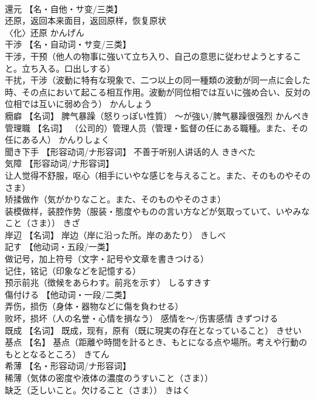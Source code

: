 \documentclass[8pt]{extreport}
\begin{document}
\begin{CJK}{UTF8}{min}
\\	還元	【名・自他・サ变/三类】 
\\	还原，返回本来面目，返回原样，恢复原状 
\\	〈化〉还原	かんげん	
\\	干渉	【名・自动词・サ变/三类】 
\\	干涉，干预（他人の物事に強いて立ち入り、自己の意思に従わせようとすること。立ち入る。口出しする） 
\\	干扰，干涉（波動に特有な現象で、二つ以上の同一種類の波動が同一点に会した時、その点において起こる相互作用。波動が同位相では互いに強め合い、反対の位相では互いに弱め合う）	かんしょう	
\\	癇癖	【名词】 脾气暴躁（怒りっぽい性質） ～が強い/脾气暴躁很强烈	かんぺき	
\\	管理職	【名词】 （公司的）管理人员（管理・監督の任にある職種。また、その任にある人）	かんりしょく	
\\	聞き下手	【形容动词/ナ形容词】 不善于听别人讲话的人	ききべた	
\\	気障	【形容动词/ナ形容词】 
\\	让人觉得不舒服，呕心（相手にいやな感じを与えること。また、そのものやそのさま） 
\\	矫揉做作（気がかりなこと。また、そのものやそのさま） 
\\	装模做样，装腔作势（服装・態度やものの言い方などが気取っていて、いやみなこと（さま））	きざ	
\\	岸辺	【名词】 岸边（岸に沿った所。岸のあたり）	きしべ	
\\	記す	【他动词・五段/一类】 
\\	做记号，加上符号（文字・記号や文章を書きつける） 
\\	记住，铭记（印象などを記憶する） 
\\	预示前兆（徴候をあらわす。前兆を示す）	しるすきす	
\\	傷付ける	【他动词・一段/二类】 
\\	弄伤，损伤（身体・器物などに傷を負わせる） 
\\	败坏，损坏（人の名誉・心情を損なう） 感情を～/伤害感情	きずつける	
\\	既成	【名词】 既成，现有，原有（既に現実の存在となっていること）	きせい	
\\	基点	【名】 基点（距離や時間を計るとき、もとになる点や場所。考えや行動のもととなるところ）	きてん	
\\	希薄	【名・形容动词/ナ形容词】 
\\	稀薄（気体の密度や液体の濃度のうすいこと（さま）） 
\\	缺乏（乏しいこと。欠けること（さま））	きはく	

\end{CJK}
\end{document}
